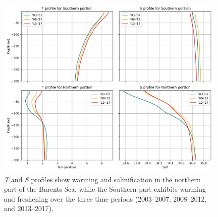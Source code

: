 \documentclass[draft]{agujournal2019}
\begin{document}
\begin{figure} %
    \centering
    \includegraphics[width=\linewidth]{figs/profiles.png}
    \caption{\emph{T} and \emph{S} profiles show warming and salinification in the northern part of the Barents Sea, while the Southern part exhibits warming and freshening over the three time periods (2003–2007, 2008–2012, and 2013–2017).}
    \label{fig:profiles}
    \vspace{-30pt}
\end{figure}
\end{document}
